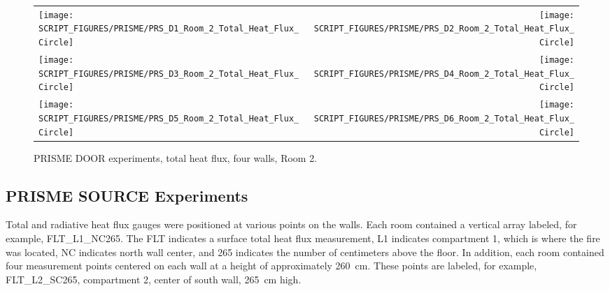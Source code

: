\begin{figure}[p]
\begin{tabular*}{\textwidth}{l@{\extracolsep{\fill}}r}
\texttt{[image: SCRIPT\_FIGURES/PRISME/PRS\_D1\_Room\_2\_Total\_Heat\_Flux\_Circle]} &
\texttt{[image: SCRIPT\_FIGURES/PRISME/PRS\_D2\_Room\_2\_Total\_Heat\_Flux\_Circle]} \\
\texttt{[image: SCRIPT\_FIGURES/PRISME/PRS\_D3\_Room\_2\_Total\_Heat\_Flux\_Circle]} &
\texttt{[image: SCRIPT\_FIGURES/PRISME/PRS\_D4\_Room\_2\_Total\_Heat\_Flux\_Circle]} \\
\texttt{[image: SCRIPT\_FIGURES/PRISME/PRS\_D5\_Room\_2\_Total\_Heat\_Flux\_Circle]} &
\texttt{[image: SCRIPT\_FIGURES/PRISME/PRS\_D6\_Room\_2\_Total\_Heat\_Flux\_Circle]}
\end{tabular*}
\caption[PRISME DOOR experiments, total heat flux, four walls, Room 2]{PRISME DOOR experiments, total heat flux, four walls, Room 2.}
\label{PRISME_Wall_Circle_THF_Room_2}
\end{figure}



\clearpage


\subsection{PRISME SOURCE Experiments}

Total and radiative heat flux gauges were positioned at various points on the walls. Each room contained a vertical array labeled, for example, FLT\_L1\_NC265. The FLT indicates a surface total heat flux measurement, L1 indicates compartment 1, which is where the fire was located, NC indicates north wall center, and 265 indicates the number of centimeters above the floor. In addition, each room contained four measurement points centered on each wall at a height of approximately 260~cm. These points are labeled, for example, FLT\_L2\_SC265, compartment 2, center of south wall, 265~cm high.

\newpage

